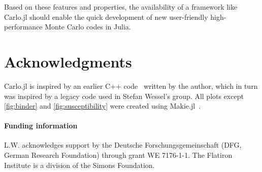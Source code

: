 \documentclass{SciPost}
\begin{document}
Based on these features and properties, the availability of a framework like Carlo.jl should enable the quick development of new user-friendly high-performance Monte Carlo codes in Julia.
\section*{Acknowledgments}
Carlo.jl is inspired by an earlier C++ code~\cite{loadleveller} written by the author, which in turn was inspired by a legacy code used in Stefan Wessel's group.
All plots except \cref{fig:binder} and \cref{fig:susceptibility} were created using Makie.jl~\cite{DanischKrumbiegel2021}.

\paragraph{Funding information}
L.W. acknowledges support by the Deutsche Forschungsgemeinschaft (DFG, German Research Foundation) through grant WE 7176-1-1.
The Flatiron Institute is a division of the Simons Foundation.
\begin{appendix}
\end{appendix}



\end{document}
